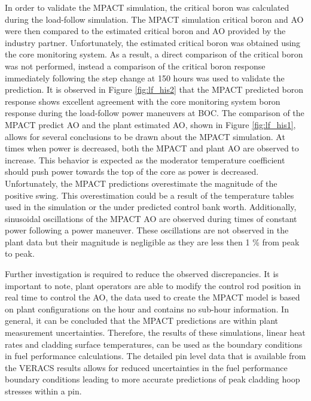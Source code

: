 \documentclass[edeposit,fullpage,11pt]{uiucthesis2009}
\begin{document}
In order to validate the MPACT simulation, the critical boron was calculated during the load-follow simulation. 
The MPACT simulation critical boron and \gls{AO} were then compared to the estimated critical boron and \gls{AO} provided by the industry partner.
Unfortunately, the estimated critical boron was obtained using the core monitoring system.
As a result, a direct comparison of the critical boron was not performed, instead a comparison of the critical boron response immediately following the step change at 150 hours was used to validate the prediction.
It is observed in Figure \ref{fig:lf_his2} that the MPACT predicted boron response shows excellent agreement with the core monitoring system boron response during the load-follow power maneuvers at \gls{BOC}.
The comparison of the MPACT predict \gls{AO} and the plant estimated \gls{AO}, shown in Figure \ref{fig:lf_his1}, allows for several conclusions to be drawn about the MPACT simulation.
At times when power is decreased, both the MPACT and plant \gls{AO} are observed to increase.
This behavior is expected as the moderator temperature coefficient should push power towards the top of the core as power is decreased.
Unfortunately, the MPACT predictions overestimate the magnitude of the positive swing.
This overestimation could be a result of the temperature tables used in the simulation or the under predicted control bank worth.
Additionally, sinusoidal oscillations of the MPACT \gls{AO} are observed during times of constant power following a power maneuver.
These oscillations are not observed in the plant data but their magnitude is negligible as they are less then 1 \% from peak to peak.
  
Further investigation is required to reduce the observed discrepancies.
It is important to note, plant operators are able to modify the control rod position in real time to control the \gls{AO}, the data used to create the MPACT model is based on plant configurations on the hour and contains no sub-hour information.
In general, it can be concluded that the MPACT predictions are within plant measurement uncertainties.
Therefore, the results of these simulations, linear heat rates and cladding surface temperatures, can be used as the boundary conditions in fuel performance calculations.
The detailed pin level data that is available from the \gls{VERACS} results allows for reduced uncertainties in the fuel performance boundary conditions leading to more accurate predictions of peak cladding hoop stresses within a pin.

\end{document}

